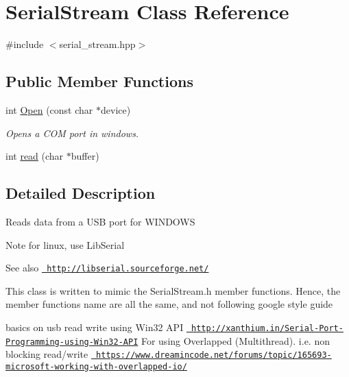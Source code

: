 \hypertarget{class_serial_stream}{}\section{Serial\+Stream Class Reference}
\label{class_serial_stream}


{\ttfamily \#include $<$serial\+\_\+stream.\+hpp$>$}

\subsection*{Public Member Functions}
\begin{DoxyCompactItemize}
\item 
int \mbox{\hyperlink{class_serial_stream_aded9d00bc991493ec5e9ee92541b7d5e}{Open}} (const char $\ast$device)
\begin{DoxyCompactList}\small\item\em Opens a C\+OM port in windows. \end{DoxyCompactList}\item 
int \mbox{\hyperlink{class_serial_stream_a4a1c1d52b598a7cb1597f8cc0450f395}{read}} (char $\ast$buffer)
\end{DoxyCompactItemize}


\subsection{Detailed Description}
Reads data from a U\+SB port for W\+I\+N\+D\+O\+WS

\begin{DoxyNote}{Note}
for linux, use Lib\+Serial 
\end{DoxyNote}
\begin{DoxySeeAlso}{See also}
\href{http://libserial.sourceforge.net/}{\texttt{ http\+://libserial.\+sourceforge.\+net/}}
\end{DoxySeeAlso}
This class is written to mimic the Serial\+Stream.\+h member functions. Hence, the member functions name are all the same, and not following google style guide

basics on usb read write using Win32 A\+PI \href{http://xanthium.in/Serial-Port-Programming-using-Win32-API}{\texttt{ http\+://xanthium.\+in/\+Serial-\/\+Port-\/\+Programming-\/using-\/\+Win32-\/\+A\+PI}} For using Overlapped (Multithread). i.\+e. non blocking read/write \href{https://www.dreamincode.net/forums/topic/165693-microsoft-working-with-overlapped-io/}{\texttt{ https\+://www.\+dreamincode.\+net/forums/topic/165693-\/microsoft-\/working-\/with-\/overlapped-\/io/}}

